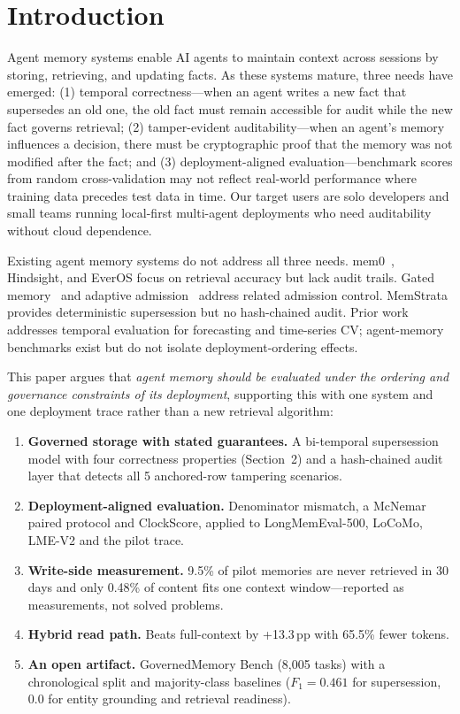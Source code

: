 \documentclass{llncs}
\begin{document}
\section{Introduction}
Agent memory systems enable AI agents to maintain context across sessions by storing, retrieving, and updating facts. As these systems mature, three needs have emerged: (1) temporal correctness---when an agent writes a new fact that supersedes an old one, the old fact must remain accessible for audit while the new fact governs retrieval; (2) tamper-evident auditability---when an agent's memory influences a decision, there must be cryptographic proof that the memory was not modified after the fact; and (3) deployment-aligned evaluation---benchmark scores from random cross-validation may not reflect real-world performance where training data precedes test data in time. Our target users are solo developers and small teams running local-first multi-agent deployments who need auditability without cloud dependence.

Existing agent memory systems do not address all three needs. mem0~\cite{mem0}, Hindsight, and EverOS focus on retrieval accuracy but lack audit trails. Gated memory~\cite{gatedmem} and adaptive admission~\cite{amac} address related admission control. MemStrata provides deterministic supersession but no hash-chained audit. Prior work addresses temporal evaluation for forecasting and time-series CV; agent-memory benchmarks exist but do not isolate deployment-ordering effects.


This paper argues that \emph{agent memory should be evaluated under the ordering and governance constraints of its deployment}, supporting this with one system and one deployment trace rather than a new retrieval algorithm:
\begin{enumerate}
\item \textbf{Governed storage with stated guarantees.} A bi-temporal supersession model with four correctness properties (Section~2) and a hash-chained audit layer that detects all 5 anchored-row tampering scenarios.
\item \textbf{Deployment-aligned evaluation.} Denominator mismatch, a McNemar paired protocol and ClockScore, applied to LongMemEval-500, LoCoMo, LME-V2 and the pilot trace.
\item \textbf{Write-side measurement.} 9.5\% of pilot memories are never retrieved in 30 days and only 0.48\% of content fits one context window---reported as measurements, not solved problems.
\item \textbf{Hybrid read path.} Beats full-context by +13.3\,pp with 65.5\% fewer tokens.
\item \textbf{An open artifact.} GovernedMemory Bench (8{,}005 tasks) with a chronological split and majority-class baselines ($F_1{=}0.461$ for supersession, 0.0 for entity grounding and retrieval readiness).
\end{enumerate}
\end{document}
